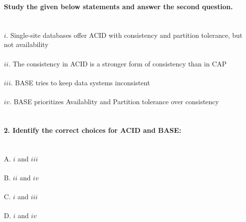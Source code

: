 \documentclass[prl,twocolumn,showpacs,preprintnumbers,superscriptaddress]{revtex4}
\theoremstyle{plain}
\theoremstyle{definition}
\begin{document}
\begin{widetext}
\textbf{Study the given below statements and answer the second question.}
\\
\\
\\
$i$. Single-site databases offer ACID with consistency and partition tolerance, but not availability
\\
\\
$ii$. The consistency in ACID is a stronger form of consistency than in CAP
\\
\\
$iii$. BASE tries to keep data systems inconsistent
\\
\\
$iv$. BASE prioritizes Availablity and Partition tolerance over consistency
\\
\\
\\
\textbf{2. Identify the correct choices for ACID and BASE:}
\\
\\
\\
A. $i$ and $iii$
\\
\\
B. $ii$ and $iv$
\\
\\
C. $i$ and $iii$
\\
\\
D. $i$ and $iv$
\\
\\

\end{widetext}
\end{document}
